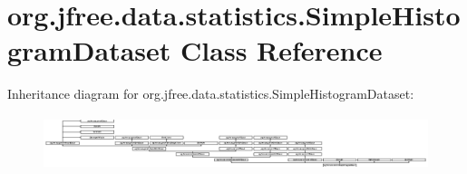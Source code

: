 \hypertarget{classorg_1_1jfree_1_1data_1_1statistics_1_1_simple_histogram_dataset}{}\section{org.\+jfree.\+data.\+statistics.\+Simple\+Histogram\+Dataset Class Reference}
\label{classorg_1_1jfree_1_1data_1_1statistics_1_1_simple_histogram_dataset}
Inheritance diagram for org.\+jfree.\+data.\+statistics.\+Simple\+Histogram\+Dataset\+:\begin{figure}[H]
\begin{center}
\leavevmode
\includegraphics[height=1.596452cm]{classorg_1_1jfree_1_1data_1_1statistics_1_1_simple_histogram_dataset}
\end{center}
\end{figure}
